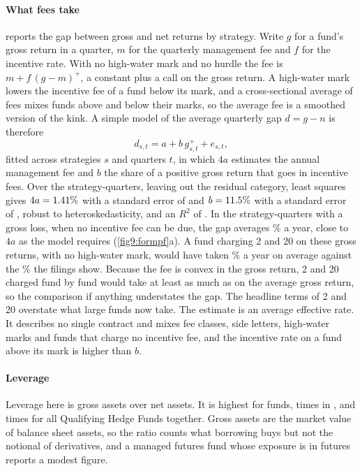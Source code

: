 \begin{chapterrefs}
\paragraph{What fees take}
 reports the gap between gross and net returns by strategy. Write $g$ for a fund's
gross return in a quarter, $m$ for the quarterly management fee and $f$ for the incentive rate. With no
high-water mark and no hurdle the fee is $m+f\,(g-m)^+$, a constant plus a call on the gross return. A
high-water mark lowers the incentive fee of a fund below its mark, and a cross-sectional average of fees
mixes funds above and below their marks, so the average fee is a smoothed version of the kink. A simple
model of the average quarterly gap $d=g-n$ is therefore
\begin{equation}\label{eq9:feefit}
  d_{s,t}=a+b\,g_{s,t}^+ +e_{s,t},
\end{equation}
fitted across strategies $s$ and quarters $t$, in which $4a$ estimates the annual management fee and $b$
the share of a positive gross return that goes in incentive fees. Over the \hdFeeObs{}
strategy-quarters, leaving out the residual category, least squares gives $4a=1.41\%$ with a
standard error of \hdFeeMgmtSe{} and $b=11.5\%$ with a standard error of \hdFeeIncSe, robust to
heteroskedasticity, and an $R^2$ of \hdFeeRsq. In the \hdFeeNegObs{} strategy-quarters with a gross loss,
when no incentive fee can be due, the gap averages \hdFeeNegDrag\% a year, close to $4a$ as the model
requires (\cref{fig9:formpf}a). A fund charging 2 and 20 on these gross returns, with no high-water
mark, would have taken \hdTwoTwentyDrag\% a year on average against the \hdActualDrag\% the filings show.
Because the fee is convex in the gross return, 2 and 20 charged fund by fund would take at least as
much as on the average gross return, so the comparison if anything understates the gap.
The headline terms of 2 and 20 overstate what large funds now take. The estimate is an average
effective rate. It describes no single contract and mixes fee classes, side letters, high-water marks and funds
that charge no incentive fee, and the incentive rate on a fund above its mark is higher than $b$.

\paragraph{Leverage}
Leverage here is gross assets over net assets. It is highest for \hdLevMaxName{} funds, \hdLevMax{}
times in \hdLast, and \hdLevAgg{} times for all Qualifying Hedge Funds together. Gross assets are the
market value of balance sheet assets, so the ratio counts what borrowing buys but not the notional of
derivatives, and a managed futures fund whose exposure is in futures reports a modest figure.


\end{chapterrefs}
